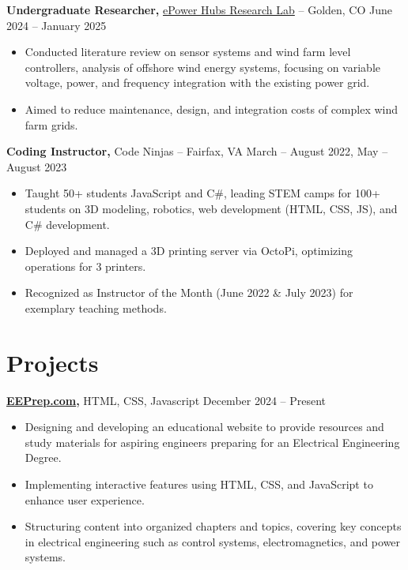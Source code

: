 \documentclass[11pt]{article}       %
\begin{document}
\textbf{Undergraduate Researcher, }{\href{https://www.epowerhubs.com/home}{ePower Hubs Research Lab}} -- Golden, CO \hfill June 2024 -- January 2025 \\
\vspace{-6.5pt}
\begin{itemize}
  \item Conducted literature review on sensor systems and wind farm level controllers, analysis of offshore wind energy systems, focusing on variable voltage, power, and frequency integration with the existing power grid.
  \item Aimed to reduce maintenance, design, and integration costs of complex wind farm grids.
\end{itemize}


\textbf{Coding Instructor, }{Code Ninjas} -- Fairfax, VA \hfill March -- August 2022, May -- August 2023 \\
\vspace{-6.5pt}
\begin{itemize}
  \item Taught 50+ students JavaScript and C\#, leading STEM camps for 100+ students on 3D modeling, robotics, web development (HTML, CSS, JS), and C\# development.
  \item Deployed and managed a 3D printing server via OctoPi, optimizing operations for 3 printers.
  \item Recognized as Instructor of the Month (June 2022 \& July 2023) for exemplary teaching methods.
\end{itemize}

\vspace{-19pt}
\section*{Projects}

\textbf{\href{https://eeprep.com}{EEPrep.com}, }{HTML, CSS, Javascript } \hfill {December 2024 -- Present} \\
\vspace{-6.5pt}
\begin{itemize}
    \item Designing and developing an educational website to provide resources and study materials for aspiring engineers preparing for an Electrical Engineering Degree.
    \item Implementing interactive features using HTML, CSS, and JavaScript to enhance user experience.
    \item Structuring content into organized chapters and topics, covering key concepts in electrical engineering such as control systems, electromagnetics, and power systems.
\end{itemize}
\end{document}
